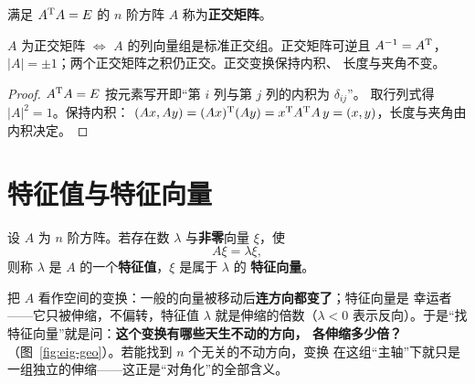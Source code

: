 \begin{definition}\label{def:orthogonal-matrix}
满足 $A^{\mathrm{T}} A=E$ 的 $n$ 阶方阵 $A$ 称为\textbf{正交矩阵}。
\end{definition}

\begin{theorem}\label{thm:orthogonal-matrix}
$A$ 为正交矩阵 $\iff$ $A$ 的列向量组是标准正交组。正交矩阵可逆且
$A^{-1}=A^{\mathrm{T}}$，$|A|=\pm1$；两个正交矩阵之积仍正交。正交变换保持内积、
长度与夹角不变。
\end{theorem}
\begin{proof}
$A^{\mathrm{T}} A=E$ 按元素写开即“第 $i$ 列与第 $j$ 列的内积为 $\delta_{ij}$”。
取行列式得 $|A|^2=1$。保持内积：
$(Ax,Ay)=(Ax)^{\mathrm{T}}(Ay)=x^{\mathrm{T}} A^{\mathrm{T}} A\,y=(x,y)$，长度与夹角由内积决定。
\end{proof}

\section{特征值与特征向量}\label{sec:eigen}

\begin{definition}\label{def:eigen}
设 $A$ 为 $n$ 阶方阵。若存在数 $\lambda$ 与\textbf{非零}向量 $\xi$，使
\[
  A\xi=\lambda\xi,
\]
则称 $\lambda$ 是 $A$ 的一个\textbf{特征值}，$\xi$ 是属于 $\lambda$ 的
\textbf{特征向量}。
\end{definition}

\begin{insight}[本质：特征向量 = 变换“不动”的方向]
把 $A$ 看作空间的变换：一般的向量被移动后\textbf{连方向都变了}；特征向量是
幸运者——它只被伸缩，不偏转，特征值 $\lambda$ 就是伸缩的倍数（$\lambda<0$
表示反向）。于是“找特征向量”就是问：\textbf{这个变换有哪些天生不动的方向，
各伸缩多少倍？}（图~\ref{fig:eig-geo}）。若能找到 $n$ 个无关的不动方向，变换
在这组“主轴”下就只是一组独立的伸缩——这正是“对角化”的全部含义。
\end{insight}

